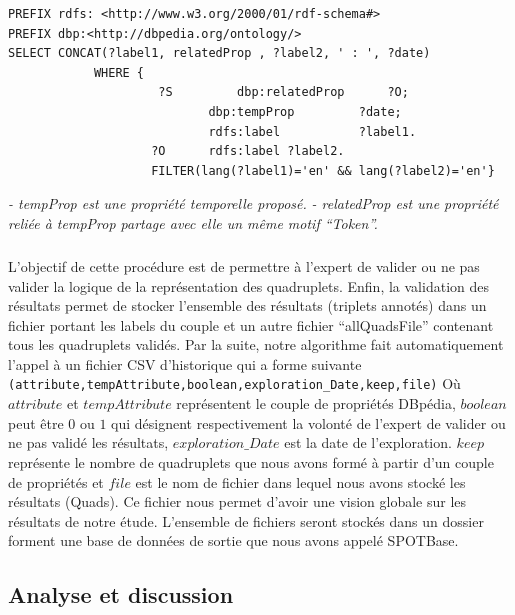 \begin{verbatim}
PREFIX rdfs: <http://www.w3.org/2000/01/rdf-schema#> 
PREFIX dbp:<http://dbpedia.org/ontology/> 
SELECT CONCAT(?label1, relatedProp , ?label2, ' : ', ?date) 
			WHERE {  
					 ?S   		dbp:relatedProp 	 ?O;
							dbp:tempProp		 ?date;
							rdfs:label 			 ?label1.
					?O 		rdfs:label ?label2.
					FILTER(lang(?label1)='en' && lang(?label2)='en'}
\end{verbatim}
{\it - tempProp est une propriété temporelle proposé.}
\newline
{\it - relatedProp est une propriété reliée à tempProp partage avec elle un même motif ``Token''.}
\subparagraph{}
L'objectif de cette procédure est de permettre à l'expert de valider ou ne pas valider la logique de la représentation des quadruplets. Enfin, la validation des résultats permet de stocker l'ensemble des résultats (triplets annotés) dans un fichier portant les labels du couple et un autre fichier ``allQuadsFile'' contenant tous les quadruplets validés. Par la suite, notre algorithme fait automatiquement l'appel à un fichier CSV d'historique qui a forme suivante 
\newline
{\tt (attribute,tempAttribute,boolean,exploration\_Date,keep,file)} 
\newline
Où $attribute$ et $tempAttribute$ représentent le couple de propriétés DBpédia, $boolean$ peut être $0$ ou $1$ qui désignent respectivement la volonté de l'expert de valider ou ne pas validé les résultats, $exploration\_Date$ est la date de l'exploration. $keep$ représente le nombre de quadruplets que nous avons formé à partir d'un couple de propriétés et $file$ est le nom de fichier dans lequel nous avons stocké les résultats (Quads).
Ce fichier nous permet d'avoir une vision globale sur les résultats de notre étude.
L'ensemble de fichiers seront stockés dans un dossier forment une base de données de sortie que nous avons appelé SPOTBase.
\subsection{Analyse et discussion}
